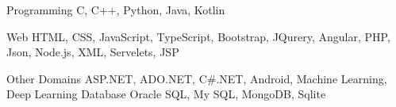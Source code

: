 

\begin{cvskills}

  \cvskill
    {Programming} %
    {C, C++, Python, Java, Kotlin} %

  \cvskill
    {Web} %
    {HTML, CSS, JavaScript, TypeScript, Bootstrap, JQurery, Angular, PHP, Json, Node.js, XML, Servelets, JSP} %

  \cvskill
    {Other Domains} %
    {ASP.NET, ADO.NET, C\#.NET, Android, Machine Learning, Deep Learning} %
  \cvskill
    {Database} %
    {Oracle SQL, My SQL, MongoDB, Sqlite } %
\end{cvskills}
